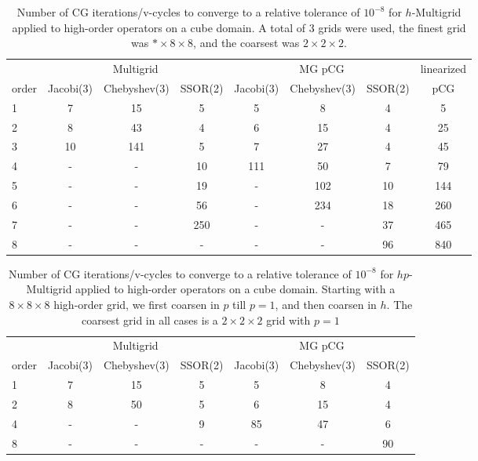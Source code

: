 
\begin{table}
  \caption{\label{tab:homg} Number of CG iterations/v-cycles to converge to a relative tolerance of $10^{-8}$ for $h$-Multigrid applied to high-order operators on a cube domain. A total of 3 grids were used, the finest grid was $*\times 8\times 8$, and the coarsest was $2\times 2\times 2$.}
		\centering
    \begin{tabular}{|l|c|c|c|c|c|c|c|} 
	    \hline
				    & \multicolumn{3}{c|}{Multigrid} & \multicolumn{3}{c|}{MG pCG} & linearized \\  \cline{2-7}
			order & \scriptsize Jacobi(3)  &\scriptsize  Chebyshev(3)  &\scriptsize SSOR(2) &\scriptsize Jacobi(3)  &\scriptsize  Chebyshev(3)  &\scriptsize SSOR(2) & pCG \\
			\hline
        1 & 7 & 15 & 5 & 5 & 8 & 4    & 5    \\
	    	2 & 8 & 43 & 4 & 6 & 15 & 4   & 25   \\
        3 & 10 & 141 & 5 & 7 & 27 & 4 & 45   \\
        4 & - & - & 10 & 111 & 50 & 7 & 79   \\
				5 & - & - & 19 & - & 102 & 10 & 144  \\
        6 & - & - & 56 & - & 234 & 18 & 260  \\
			  7 & - & - & 250 & - & - & 37  & 465  \\	
				8 & - & - & -   & - & - & 96  & 840  \\
			\hline
	  \end{tabular}
\end{table}

\begin{table}
  \caption{\label{tab:hpmg} Number of CG iterations/v-cycles to converge to a relative tolerance of $10^{-8}$ for $hp$-Multigrid applied to high-order operators on a cube domain. Starting with a $8\times 8\times 8$ high-order grid, we first coarsen in $p$ till $p=1$, and then coarsen in $h$. The coarsest grid in all cases is a $2\times 2\times 2$ grid with $p=1$}
		\centering
		\begin{tabular}{|l|c|c|c|c|c|c|} 
	    \hline
				    & \multicolumn{3}{c|}{Multigrid} & \multicolumn{3}{c|}{MG pCG}\\  \cline{2-7}
			order & \scriptsize Jacobi(3)  &\scriptsize  Chebyshev(3)  &\scriptsize SSOR(2) &\scriptsize Jacobi(3)  &\scriptsize  Chebyshev(3)  &\scriptsize SSOR(2) \\
			\hline
        1 & 7 & 15 & 5 & 5 & 8 & 4 \\
        2 & 8 & 50 & 5 & 6 & 15 & 4 \\
			  4 & - & - & 9 & 85 & 47 & 6 \\
        8 & - & - & - & -  &  - & 90 \\
      \hline
	  \end{tabular}
\end{table}

